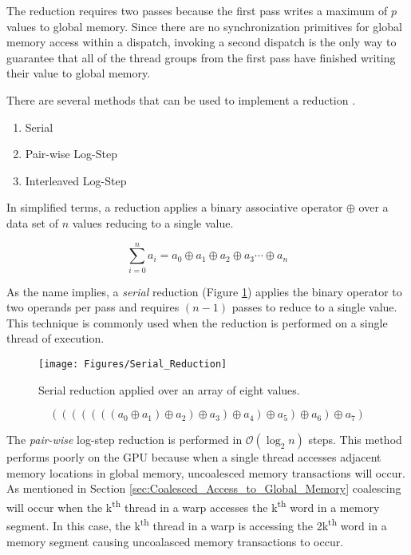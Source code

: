 The reduction requires two passes because the first pass writes a maximum of $p$ values to global memory. Since there are no synchronization primitives for global memory access within a dispatch, invoking a second dispatch is the only way to guarantee that all of the thread groups from the first pass have finished writing their value to global memory.

There are several methods that can be used to implement a reduction \parencite{23_wilt_2013}.

\begin{enumerate}
\item{Serial}
\item{Pair-wise Log-Step}
\item{Interleaved Log-Step}
\end{enumerate}

In simplified terms, a reduction applies a binary associative operator $\oplus$ over a data set of $n$ values reducing to a single value.

\begin{equation}
\sum_{i=0}^{n}a_i = a_0 \oplus a_1 \oplus a_2 \oplus a_3 \cdots \oplus a_n
\label{eqn:reduction}
\end{equation}

As the name implies, a \emph{serial} reduction (Figure \ref{fig:Serial_Reduction}) applies the binary operator to two operands per pass and requires $(n-1)$ passes to reduce to a single value. This technique is commonly used when the reduction is performed on a single thread of execution.

\begin{figure}[H]
\centering
\texttt{[image: Figures/Serial\_Reduction]}
\decoRule
\caption{Serial reduction applied over an array of eight values.}
\label{fig:Serial_Reduction}
\end{figure}

\begin{equation}
((((((( a_0 \oplus a_1 ) \oplus a_2 ) \oplus a_3 ) \oplus a_4 ) \oplus a_5 ) \oplus a_6 ) \oplus a_7 )
\label{eqn:Serial_Reduction}
\end{equation}

The \emph{pair-wise} log-step reduction is performed in $\mathcal{O}(\log_{2}n)$ steps. This method performs poorly on the GPU because when a single thread accesses adjacent memory locations in global memory, uncoalesced memory transactions will occur. As mentioned in Section \ref{sec:Coalesced_Access_to_Global_Memory} coalescing will occur when the k\textsuperscript{th} thread in a warp accesses the k\textsuperscript{th} word in a memory segment. In this case, the k\textsuperscript{th} thread in a warp is accessing the 2k\textsuperscript{th} word in a memory segment causing uncoalasced memory transactions to occur.

